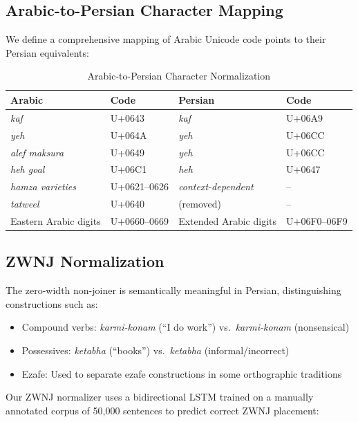 \documentclass[11pt,a4paper]{article}
\begin{document}
\subsection{Arabic-to-Persian Character Mapping}

We define a comprehensive mapping of Arabic Unicode code points to their Persian equivalents:

\begin{table}[H]
\centering
\caption{Arabic-to-Persian Character Normalization}
\label{tab:char-map}
\begin{tabular}{llll}
\toprule
\textbf{Arabic} & \textbf{Code} & \textbf{Persian} & \textbf{Code} \\
\midrule
\textit{kaf} & U+0643 & \textit{kaf} & U+06A9 \\
\textit{yeh} & U+064A & \textit{yeh} & U+06CC \\
\textit{alef maksura} & U+0649 & \textit{yeh} & U+06CC \\
\textit{heh goal} & U+06C1 & \textit{heh} & U+0647 \\
\textit{hamza varieties} & U+0621--0626 & \textit{context-dependent} & -- \\
\textit{tatweel} & U+0640 & (removed) & -- \\
Eastern Arabic digits & U+0660--0669 & Extended Arabic digits & U+06F0--06F9 \\
\bottomrule
\end{tabular}
\end{table}

\subsection{ZWNJ Normalization}

The zero-width non-joiner is semantically meaningful in Persian, distinguishing constructions such as:

\begin{itemize}
    \item Compound verbs: \textit{karmi-konam} (``I do work'') vs.\ \textit{karmi-konam} (nonsensical)
    \item Possessives: \textit{ketabha} (``books'') vs.\ \textit{ketabha} (informal/incorrect)
    \item Ezafe: Used to separate ezafe constructions in some orthographic traditions
\end{itemize}

Our ZWNJ normalizer uses a bidirectional LSTM trained on a manually annotated corpus of 50{,}000 sentences to predict correct ZWNJ placement:
\end{document}
